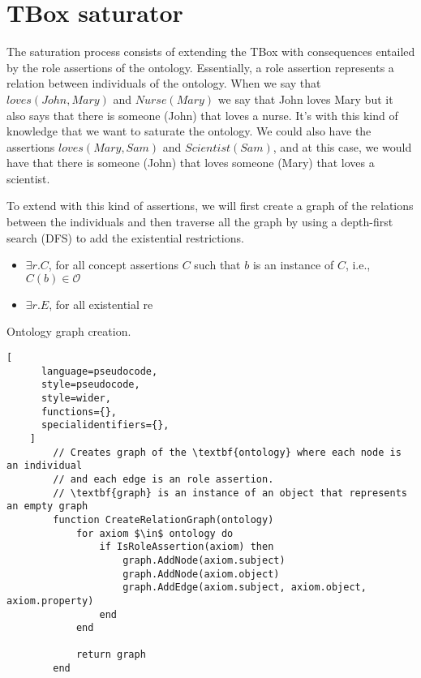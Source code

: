 
\chapter{TBox saturator}

The saturation process consists of extending the TBox with consequences entailed by the role assertions of the ontology. Essentially, a role assertion represents a relation between individuals of the ontology. When we say that $loves(John, Mary)$ and $Nurse(Mary)$ we say that John loves Mary but it also says that there is someone (John) that loves a nurse. It's with this kind of knowledge that we want to saturate the ontology. We could also have the assertions $loves(Mary, Sam)$ and $Scientist(Sam)$, and at this case, we would have that there is someone (John) that loves someone (Mary) that loves a scientist.

To extend with this kind of assertions, we will first create a graph of the relations between the individuals and then traverse all the graph by using a depth-first search (DFS) to add the existential restrictions. 

\begin{itemize}
    \item $\exists r.C$, for all concept assertions $C$ such that $b$ is an instance of $C$, i.e., $C(b) \in \mathcal{O}$
    \item $\exists r.E$, for all existential re
\end{itemize}


\begin{programruledcaption}{Ontology graph creation.\label{prog:create-graph}}
    \begin{lstlisting}[
      language=pseudocode,
      style=pseudocode,
      style=wider,
      functions={},
      specialidentifiers={},
    ]
        // Creates graph of the \textbf{ontology} where each node is an individual 
        // and each edge is an role assertion.
        // \textbf{graph} is an instance of an object that represents an empty graph
        function CreateRelationGraph(ontology)
            for axiom $\in$ ontology do
                if IsRoleAssertion(axiom) then
                    graph.AddNode(axiom.subject)
                    graph.AddNode(axiom.object)
                    graph.AddEdge(axiom.subject, axiom.object, axiom.property) 
                end
            end 

            return graph
        end
    \end{lstlisting}
\end{programruledcaption}

